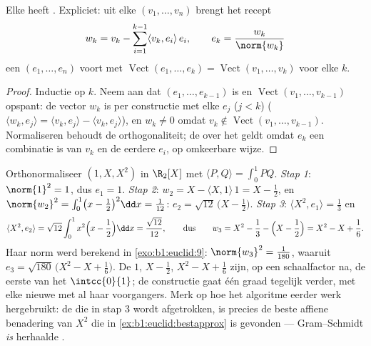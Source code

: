 \begin{theorem}\label{thm:b1:euclid:gramschmidt}
Elke  heeft  . Expliciet: uit
elke  $(v_1, \dots, v_n)$ brengt het
recept
\[
w_k = v_k - \sum_{i=1}^{k-1} \langle v_k, e_i\rangle\, e_i ,
\qquad
e_k = \frac{w_k}{\norm{w_k}}
\]
een   $(e_1, \dots, e_n)$ voort met
$\operatorname{Vect}(e_1, \dots, e_k) = \operatorname{Vect}(v_1,
\dots, v_k)$ voor elke $k$.
\end{theorem}

\begin{proof}
Inductie op $k$. Neem aan dat $(e_1, \dots, e_{k-1})$ 
is en $\operatorname{Vect}(v_1, \dots, v_{k-1})$ opspant: de vector
$w_k$ is per constructie  met elke $e_j$ ($j < k$)
($\langle w_k, e_j \rangle = \langle v_k, e_j\rangle - \langle v_k,
e_j\rangle$), en $w_k \neq 0$ omdat $v_k \notin
\operatorname{Vect}(v_1, \dots, v_{k-1})$. Normaliseren behoudt de
orthogonaliteit; de  over het  geldt omdat $e_k$
een combinatie is van $v_k$ en de eerdere $e_i$, op omkeerbare
wijze.
\end{proof}

\begin{example}
\label{ex:b1:euclid:legendre}
Orthonormaliseer $(1, X, X^2)$ in $\R_2[X]$ met $\langle P,
Q\rangle = \int_0^1 PQ$. \emph{Stap 1}: $\norm{1}^2 = 1$, dus $e_1
= 1$. \emph{Stap 2}: $w_2 = X - \langle X, 1\rangle\,1 = X -
\frac12$, en $\norm{w_2}^2 = \int_0^1\bigl(x - \frac12\bigr)^2 \dd
x = \frac1{12}$: $e_2 = \sqrt{12}\,\bigl(X - \frac12\bigr)$.
\emph{Stap 3}: $\langle X^2, e_1\rangle = \frac13$ en
\[
\langle X^2, e_2\rangle
= \sqrt{12}\int_0^1 x^2\Bigl(x - \frac12\Bigr)\dd x
= \frac{\sqrt{12}}{12},
\qquad\text{dus}\qquad
w_3 = X^2 - \frac13 - \Bigl(X - \frac12\Bigr)
= X^2 - X + \frac16 .
\]
Haar norm werd berekend in \cref{exo:b1:euclid:9}: $\norm{w_3}^2 =
\frac1{180}$, waaruit $e_3 = \sqrt{180}\,\bigl(X^2 - X +
\frac16\bigr)$. De  $1$, $X - \frac12$, $X^2 - X +
\frac16$ zijn, op een schaalfactor na, de eerste
\emph{} van het  $\intcc{0}{1}$; de
constructie gaat één graad tegelijk verder, met elke nieuwe
  met al haar voorgangers. Merk op hoe het
algoritme eerder werk hergebruikt: de  die in stap 3 wordt
afgetrokken, is precies de beste affiene benadering van $X^2$ die
in \cref{ex:b1:euclid:bestapprox} is gevonden --- Gram--Schmidt
\emph{is} herhaalde .
\end{example}

